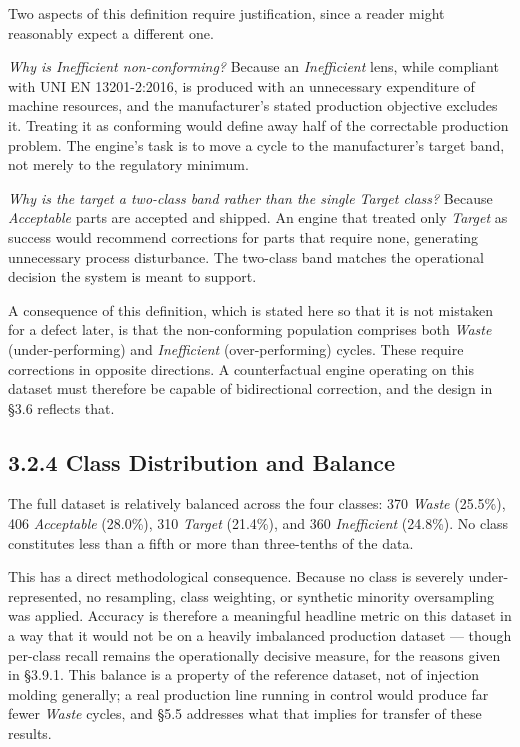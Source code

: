 Two aspects of this definition require justification, since a reader might reasonably expect a different one.

\emph{Why is Inefficient non-conforming?} Because an \emph{Inefficient} lens, while compliant with UNI EN 13201-2:2016, is produced with an unnecessary expenditure of machine resources, and the manufacturer's stated production objective excludes it. Treating it as conforming would define away half of the correctable production problem. The engine's task is to move a cycle to the manufacturer's target band, not merely to the regulatory minimum.

\emph{Why is the target a two-class band rather than the single Target class?} Because \emph{Acceptable} parts are accepted and shipped. An engine that treated only \emph{Target} as success would recommend corrections for parts that require none, generating unnecessary process disturbance. The two-class band matches the operational decision the system is meant to support.

A consequence of this definition, which is stated here so that it is not mistaken for a defect later, is that the non-conforming population comprises both \emph{Waste} (under-performing) and \emph{Inefficient} (over-performing) cycles. These require corrections in opposite directions. A counterfactual engine operating on this dataset must therefore be capable of bidirectional correction, and the design in §3.6 reflects that.

\hypertarget{class-distribution-and-balance}{%
\subsection{3.2.4 Class Distribution and Balance}\label{class-distribution-and-balance}}

The full dataset is relatively balanced across the four classes: 370 \emph{Waste} (25.5\%), 406 \emph{Acceptable} (28.0\%), 310 \emph{Target} (21.4\%), and 360 \emph{Inefficient} (24.8\%). No class constitutes less than a fifth or more than three-tenths of the data.

This has a direct methodological consequence. Because no class is severely under-represented, no resampling, class weighting, or synthetic minority oversampling was applied. Accuracy is therefore a meaningful headline metric on this dataset in a way that it would not be on a heavily imbalanced production dataset --- though per-class recall remains the operationally decisive measure, for the reasons given in §3.9.1. This balance is a property of the reference dataset, not of injection molding generally; a real production line running in control would produce far fewer \emph{Waste} cycles, and §5.5 addresses what that implies for transfer of these results.

